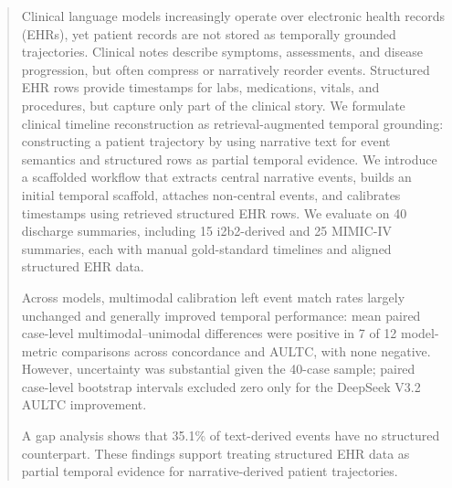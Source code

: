 \documentclass{ws-procs11x85}
\newif\ifshowrebuttalcolor
\newcommand{\rebuttal}[1]{%
  \ifshowrebuttalcolor
    \textcolor{rebuttalblue}{#1}%
  \else
    #1%
  \fi
}
\begin{document}
\begin{abstract}
Clinical language models increasingly operate over electronic health records (EHRs), yet patient records are not stored as temporally grounded trajectories. Clinical notes describe symptoms, assessments, and disease progression, but often compress or narratively reorder events. Structured EHR rows provide timestamps for labs, medications, vitals, and procedures, but capture only part of the clinical story. We formulate clinical timeline reconstruction as retrieval-augmented temporal grounding: constructing a patient trajectory by using narrative text for event semantics and structured rows as partial temporal evidence. We introduce a scaffolded workflow that extracts central narrative events, builds an initial temporal scaffold, attaches non-central events, and calibrates timestamps using retrieved structured EHR rows. We evaluate on 40 discharge summaries, including 15 i2b2-derived and 25 MIMIC-IV summaries, each with manual gold-standard timelines and aligned structured EHR data. 
\rebuttal{Across models, multimodal calibration left event match rates largely unchanged and generally improved temporal performance: mean paired case-level multimodal--unimodal differences were positive in 7 of 12 model-metric comparisons across concordance and AULTC, with none negative. However, uncertainty was substantial given the 40-case sample; paired case-level bootstrap intervals excluded zero only for the DeepSeek V3.2 AULTC improvement.}
A gap analysis shows that 35.1\% of text-derived events have no structured counterpart. These findings support treating structured EHR data as partial temporal evidence for narrative-derived patient trajectories.
\end{abstract}



\end{document}
